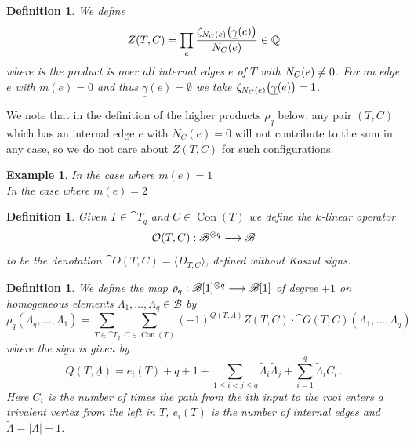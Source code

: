 \documentclass[english,letter paper,12pt,leqno]{article}
\theoremstyle{example}
\newtheorem{definition}[theorem]{Definition}
\newtheorem{example}[theorem]{Example}
\numberwithin{equation}{section}
\begin{document}
\begin{definition} We define
\begin{gather*}
Z(T,C) = \prod_{e} \frac{ \zeta_{N_C(e)}\big( \underline{\gamma}(e) \big)}{ N_C(e) } \in \mathbb{Q}
\end{gather*}
where is the product is over all internal edges $e$ of $T$ with $N_C(e) \neq 0$. For an edge $e$ with $m(e) = 0$ and thus $\underline{\gamma}(e) = \emptyset$ we take $\zeta_{N_C(e)}\big( \underline{\gamma}(e) \big) = 1$.
\end{definition}

We note that in the definition of the higher products $\rho_q$ below, any pair $(T,C)$ which has an internal edge $e$ with $N_C(e) = 0$ will not contribute to the sum in any case, so we do not care about $Z(T,C)$ for such configurations.

\begin{example} In the case where $m(e) = 1$ 
\[

\]
In the case where $m(e) = 2$
\end{example}

\begin{definition} Given $T \in \cat{T}_q$ and $C \in \operatorname{Con}(T)$ we define the $k$-linear operator
\[
\mathcal{O}(T, C): \mathscr{B}^{\otimes q} \longrightarrow \mathscr{B}
\]
to be the denotation $\cat{O}(T,C) = \langle D_{T,C} \rangle$, defined without Koszul signs.
\end{definition}

\begin{definition} We define the map $\rho_q: \mathscr{B}[1]^{\otimes q} \longrightarrow \mathscr{B}[1]$ of degree $+1$ on homogeneous elements $\Lambda_1,\ldots,\Lambda_q \in \mathscr{B}$ by
\[
\rho_q( \Lambda_q, \ldots, \Lambda_1 ) = \sum_{T \in \cat{T}_q} \sum_{C \in \operatorname{Con}(T)} (-1)^{Q(T, \underline{\Lambda})} Z(T,C) \cdot \cat{O}(T, C)( \Lambda_1, \ldots, \Lambda_q )
\]
where the sign is given by
\[
Q(T, \underline{\Lambda}) = e_i(T) + q + 1 + \sum_{1 \le i < j \le q} \widetilde{\Lambda}_i \widetilde{\Lambda}_j + \sum_{i=1}^q \widetilde{\Lambda}_i C_i\,.
\]
Here $C_i$ is the number of times the path from the $i$th input to the root enters a trivalent vertex from the left in $T$, $e_i(T)$ is the number of internal edges and $\widetilde{\Lambda} = |\Lambda| - 1$.
\end{definition}
\end{document}
